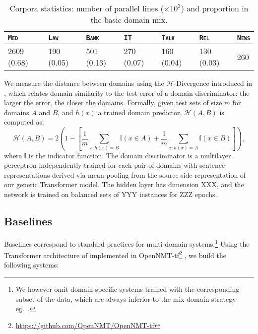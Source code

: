 \documentclass[11pt]{article}
\newcommand{\fyTodo}[1]{\Todo[FY:]{\textcolor{orange}{#1}}}
\newcommand{\domain}[1]{\texttt{\textsc{#1}}}
\begin{document}
\begin{table}[h]
  \centering
  \begin{tabular}{ |lllllll|} %
    \hline
    \domain{Med} & \domain{Law} & \domain{Bank} & \domain{IT} & \domain{Talk} & \domain{Rel} & \domain{News} \\
    \hline
    2609 (0.68) & 190 (0.05)  & 501 (0.13) & 270 (0.07) & 160 (0.04) & 130 (0.03) & 260  \\
    \hline
  \end{tabular}
\caption{Corpora statistics: number of parallel lines ($\times 10^3$) and proportion in the basic domain mix.}
\label{tab:Corpora}
\end{table}

We measure the distance between domains using the $\mathcal{H}$-Divergence introduced in \cite{Ben-David09atheory}, which relates domain similarity to the test error of a domain discriminator: the larger the error, the closer the domains. Formally, given test sets of size $m$ for domains $A$ and $B$, and $h(x)$ a trained domain predictor, $\mathcal{H}(A,B)$ is computed as:
$$
\mathcal{H}(A,B) = 2(1 - [\frac{1}{m} \sum_{x:h(x) = B} \mathbb{I}( x \in A) + \frac{1}{m} \sum_{x: h(x) = A} \mathbb{I}(x \in B)]),
$$
where $\mathbb{I}$ is the indicator function. The  domain discriminator is a multilayer perceptron independently trained for each pair of domains with sentence representations derived via mean pooling from the source side representation of our generic Transformer model. The hidden layer has dimension XXX, and the network is trained on balanced sets of YYY instances for ZZZ epochs.\fyTodo{TBC}.

\subsection{Baselines \label{ssec:baselines}}

Baselines correspond to standard practices for multi-domain systems.\footnote{We however omit domain-specific systems trained with the corresponding subset of the data, which are always inferior to the mix-domain strategy eg.\ \cite{Britz17mixing}.} Using the Transformer architecture of  implemented in OpenNMT-tf\footnote{\url{https://github.com/OpenNMT/OpenNMT-tf}} \cite{Klein17opennmt}, we build the following systems:
\end{document}
